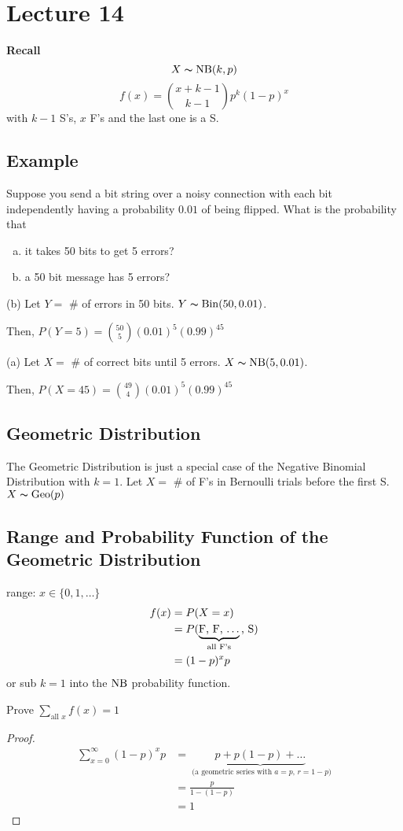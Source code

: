 \section{Lecture 14}

\textbf{Recall} 
\[ X\thicksim\operatorname{NB}(k,p) \]
\[ f(x)=\binom{x+k-1}{k-1}p^k(1-p)^x \]
with $ k-1 $ S's, $ x $ F's and the last one is a S.

\subsection{Example}
Suppose you send a bit string over a noisy connection with
each bit independently having a probability $ 0.01 $ of being
flipped. What is the probability that
\begin{enumerate}[(a)]
    \item it takes 50 bits to get 5 errors?
    \item a 50 bit message has 5 errors?
\end{enumerate}

(b) Let $ Y= $ \# of errors in 50 bits. $ Y\thicksim\operatorname{Bin}(50,0.01) $.

Then, $ P(Y=5)=\binom{50}{5}(0.01)^5(0.99)^{45} $

(a) Let $ X= $ \# of correct bits until 5 errors.
$ X\thicksim\operatorname{NB}(5,0.01) $. 

Then, $ P(X=45)=\binom{49}{4}(0.01)^5(0.99)^{45} $ 

\subsection{Geometric Distribution}
The Geometric Distribution is just a special case of the
Negative Binomial Distribution with $ k=1 $.
Let $ X= $ \# of F's in Bernoulli trials before the first S.
$ X\thicksim\operatorname{Geo}(p) $

\subsection{Range and Probability Function of the Geometric Distribution}
range: $ x\in\{0,1,\ldots \} $ 
\begin{align*}
    f(x)&=P(X=x)\\
    &=P( \underbrace{\text{F, F, $ \ldots $}}_{\text{all F's}}
    \text{, S})\\
    &=(1-p)^x p
\end{align*}
or sub $ k=1 $ into the $ \operatorname{NB} $ probability function.

Prove $ \sum\limits_{\text{all } x}^{} f(x) =1$
\begin{proof}
    \begin{align*}
        \sum\limits_{x=0}^{\infty} (1-p)^x p
        &=\underbrace{p+p(1-p)+\dots}_
        \text{ (a geometric series with $a=p$, $r=1-p$)}\\
        &=\frac{p}{1-(1-p)}\\
        &=1
    \end{align*}
\end{proof}

